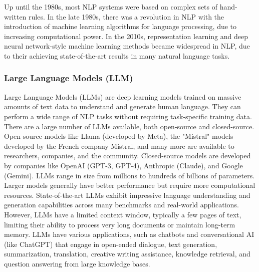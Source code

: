 \documentclass{article}
\begin{document}
Up until the 1980s, most NLP systems were based on complex sets of
hand-written rules. In the late 1980s, there was a revolution in NLP with
the introduction of machine learning algorithms for language processing,
due to increasing computational power. In the 2010s, representation learning
and deep neural network-style machine learning methods became widespread in
NLP, due to their achieving state-of-the-art results in many natural language
tasks.


\subsubsection{Large Language Models (LLM)}



Large Language Models (LLMs) are deep learning models trained on massive
amounts of text data to understand and generate human language. They can
perform a wide range of NLP tasks without requiring task-specific training data.
There are a large number of LLMs available, both open-source and closed-source.
Open-source models like Llama (developed by Meta), the "Mistral" models
developed by the French company Mistral, and many more are available to
researchers, companies, and the community. Closed-source models are
developed by companies like OpenAI (GPT-3, GPT-4), Anthropic (Claude),
and Google (Gemini).
LLMs range in size from millions to hundreds of billions of parameters. %
Larger models generally have better performance but require more computational
resources. State-of-the-art LLMs exhibit impressive language understanding
and generation capabilities across many benchmarks and real-world
applications. However, LLMs have a limited context window, typically
a few pages of text, limiting their ability to process very long documents
or maintain long-term memory.
LLMs have various applications, such as chatbots and conversational AI
(like ChatGPT) that engage in open-ended dialogue, text generation,
summarization, translation, creative writing assistance, knowledge
retrieval, and question answering from large knowledge bases.
\end{document}
